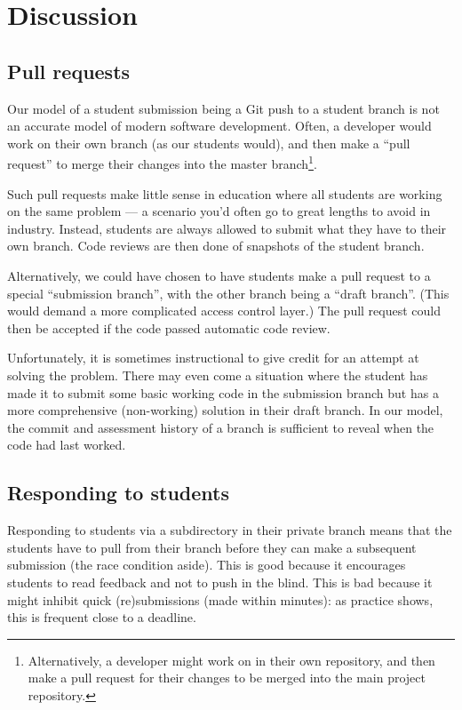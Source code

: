 
\section{Discussion}

\subsection{Pull requests}

Our model of a student submission being a Git push to a student branch is not
an accurate model of modern software development. Often, a developer would work
on their own branch (as our students would), and then make a ``pull request''
to merge their changes into the master branch\footnote{Alternatively, a
developer might work on in their own repository, and then make a pull request
for their changes to be merged into the main project
repository\cite{bird-et-al-2009}.}.

Such pull requests make little sense in education where all students are
working on the same problem --- a scenario you'd often go to great lengths to
avoid in industry. Instead, students are always allowed to submit what they
have to their own branch. Code reviews are then done of snapshots of the
student branch.

Alternatively, we could have chosen to have students make a pull request to a
special ``submission branch'', with the other branch being a ``draft branch''.
(This would demand a more complicated access control layer.) The pull request
could then be accepted if the code passed automatic code review.

Unfortunately, it is sometimes instructional to give credit for an attempt at
solving the problem. There may even come a situation where the student has made
it to submit some basic working code in the submission branch but has a more
comprehensive (non-working) solution in their draft branch. In our model, the
commit and assessment history of a branch is sufficient to reveal when the code
had last worked.

\subsection{Responding to students}

Responding to students via a subdirectory in their private branch means that
the students have to pull from their branch before they can make a subsequent
submission (the race condition aside). This is good because it encourages
students to read feedback and not to push in the blind. This is bad because it
might inhibit quick (re)submissions (made within minutes): as practice shows,
this is frequent close to a deadline.


